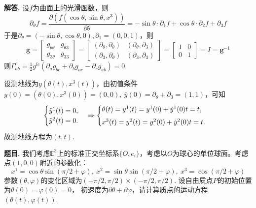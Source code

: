 \documentclass[12pt, a4paper, oneside]{ctexart}
\newcounter{problem}  %
\newenvironment{problem}[1][]{\stepcounter{problem}\par\noindent\textbf{题目\arabic{problem}. #1}}{\smallskip\par}
\newenvironment{solution}[1][]{\par\noindent\textbf{#1解答. }}{\smallskip\par}  %
\def\bd{\boldsymbol}        %
\def\E{\mathbb{E}}          %
\def\add{\vspace{1ex}}      %
\begin{document}
\begin{solution}
    设$f$为曲面上的光滑函数，则
    \begin{equation*}
        \partial_\theta f = \frac{\partial(f(\cos\theta,\sin\theta,x^3))}{\partial\theta} = -\sin\theta\cdot\partial_1f+\cos\theta\cdot\partial_2f+\partial_3f
    \end{equation*}
    于是$\partial_\theta = (-\sin\theta,\cos\theta,0),\partial_1 = (0,0,1)$，则
    \begin{equation*}
        \bd{g} = \begin{bmatrix}
            g_{\theta\theta}&g_{\theta 3}\\
            g_{3\theta}&g_{33}
        \end{bmatrix} = \begin{bmatrix}
            (\partial_\theta,\partial_\theta)&(\partial_\theta,\partial_3)\\
            (\partial_3,\partial_\theta)&(\partial_3,\partial_3)
        \end{bmatrix} = \begin{bmatrix}
            1&0\\ 0 &1
        \end{bmatrix}=I= \bd{g}^{-1}
    \end{equation*}
    则$\Gamma_{ab}^l = \frac{1}{2}g^{lc}(\partial_ag_{bc}+\partial_bg_{ac}-\partial_cg_{ab}) = 0$.\add

    设测地线为$y(\theta(t),x^3(t))$，由初值条件$y(0) = (\theta(0),x^3(0)) = (0,0),\ \hat{y}(0) = \partial_\theta + \partial_3 = (1,1)$，可知
    \begin{equation*}
        \begin{cases}
            \ddot{y}^1(t) = 0,\\
            \ddot{y}^2(t) = 0.
        \end{cases}\Rightarrow\begin{cases}
            \theta(t) = y^1(t) = y^1(0) + \dot{y}^1(0)t = t,\add\\
            x^3(t) = y^2(t) = y^2(0) + \dot{y}^2(0)t = t.
        \end{cases}
    \end{equation*}
    故测地线方程为$\left(t, t\right)$.
\end{solution}
\begin{problem}
    我们考虑$\E^3$上的标准正交坐标系$\{O,e_i\}$，考虑以$O$为球心的单位球面。考虑点$(1,0,0)$附近的参数化：
    \begin{equation*}
        x^1 = \cos\theta\sin(\pi/2+\varphi),\ x^2 = \sin\theta\sin(\pi/2+\varphi),\ x^3=\cos(\pi/2+\varphi)
    \end{equation*}
    参数$(\theta,\varphi)$的变化区域为$(-\pi/2,\pi/2)\times(-\pi/2,\pi/2)$. 设自由质点$P$的初始位置为$\theta(0) = \varphi(0) = 0$，
    初速度为$\partial\theta+\partial\varphi$，请计算质点的运动方程$(\theta(t),\varphi(t))$.
\end{problem}
\end{document}
